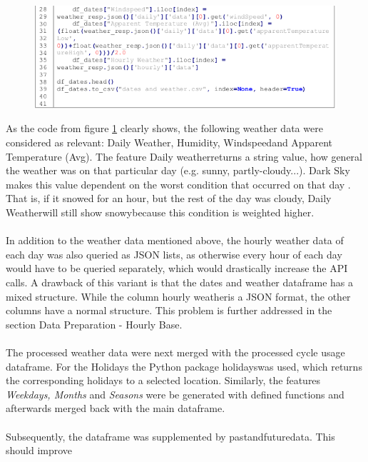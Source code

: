 \begin{figure}[H]
\hspace{-1.6cm}
\includegraphics[width=1.2\textwidth]{img/listing4}\label{fig:listing4}
\label{fig:listing4}
\end{figure}
As the code from figure \ref{fig:listing4} clearly shows, the following weather data were considered as relevant:
\glqq Daily Weather, Humidity, Windspeed\grqq and \glqq Apparent Temperature (Avg)\grqq . The feature \glqq Daily
weather\grqq returns a string value, how general the weather was on that particular day (e.g. sunny,
partly-cloudy...). Dark Sky makes this value dependent on the worst condition that occurred on
that day \cite{RN7}. That is, if it snowed for an hour, but the rest of the day was cloudy, \glqq Daily Weather\grqq will still show \glqq snowy\grqq  because this condition is weighted higher.\\\\
In addition to the weather data mentioned above, the hourly weather data of each day was also
queried as JSON lists, as otherwise every hour of each day would have to be queried separately,
which would drastically increase the API calls. A drawback of this variant is that the dates and
weather dataframe has a mixed structure. While the column \glqq hourly weather\grqq is a JSON format,
the other columns have a normal structure. This problem is further addressed in the section \glqq Data
Preparation - Hourly Base\grqq .\\\\
The processed weather data were next merged with the processed cycle usage dataframe. For
the Holidays the Python package \glqq holidays\grqq was used, which returns the corresponding holidays
to a selected location. Similarly, the features \emph{Weekdays, Months} and \emph{Seasons} were be
generated with defined functions and afterwards merged back with the main dataframe.\\\\
Subsequently, the dataframe was supplemented by \glqq past\grqq and\glqq future\grqq data. This should improve
